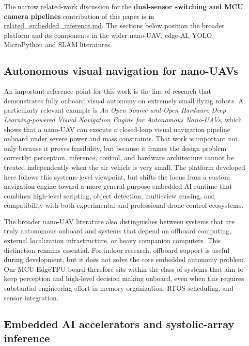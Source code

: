 The narrow related-work discussion for the \textbf{dual-sensor switching
and MCU camera pipelines} contribution of this paper is in
\url{related_embedded_inference.md}. The sections below position the
broader platform and its components in the wider nano-UAV, edge-AI,
YOLO, MicroPython and SLAM literatures.

\subsection{Autonomous visual navigation for
nano-UAVs}\label{autonomous-visual-navigation-for-nano-uavs}

An important reference point for this work is the line of research that
demonstrates fully onboard visual autonomy on extremely small flying
robots. A particularly relevant example is \emph{An Open Source and Open
Hardware Deep Learning-powered Visual Navigation Engine for Autonomous
Nano-UAVs}, which shows that a nano-UAV can execute a closed-loop visual
navigation pipeline onboard under severe power and mass constraints.
That work is important not only because it proves feasibility, but
because it frames the design problem correctly: perception, inference,
control, and hardware architecture cannot be treated independently when
the air vehicle is very small. The platform developed here follows this
systems-level viewpoint, but shifts the focus from a custom navigation
engine toward a more general-purpose embedded AI runtime that combines
high-level scripting, object detection, multi-view sensing, and
compatibility with both experimental and professional drone-control
ecosystems.

The broader nano-UAV literature also distinguishes between systems that
are truly autonomous onboard and systems that depend on offboard
computing, external localization infrastructure, or heavy companion
computers. This distinction remains essential. For indoor research,
offboard support is useful during development, but it does not solve the
core embedded autonomy problem. Our MCU-EdgeTPU board therefore sits
within the class of systems that aim to keep perception and high-level
decision making onboard, even when this requires substantial engineering
effort in memory organization, RTOS scheduling, and sensor integration.

\subsection{Embedded AI accelerators and systolic-array
inference}\label{embedded-ai-accelerators-and-systolic-array-inference}

